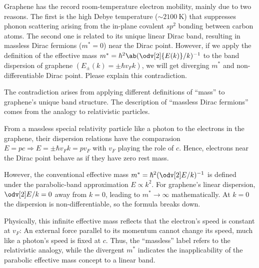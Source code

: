 \begin{problem}
  Graphene has the record room-temperature electron mobility, mainly due to two
  reasons. The first is the high Debye temperature ($\sim\qty{2100}\K$) that
  suppresses phonon scattering arising from the in-plane covalent $sp^2$ bonding
  between carbon atoms. The second one is related to its unique linear Dirac
  band, resulting in massless Dirac fermions ($m^* = 0$) near the Dirac point.
  However, if we apply the definition of the effective
  mass $m^* = \hbar^2\ab(\odv[2]{E(k)}/k)^{-1}$ to the band dispersion of
  graphene $(E_\pm(k) = \pm \hbar v_Fk)$, we will get diverging $m^*$ and
  non-differentiable Dirac point. Please explain this contradiction.
\end{problem}
\begin{solution}
  The contradiction arises from applying different definitions of ``mass'' to
  graphene's unique band structure. The description of ``massless Dirac
  fermions'' comes from the analogy to relativistic particles.

  From a massless special relativity particle like a photon to the electrons in
  the graphene, their dispersion relations have the comparasion
  $E = pc \Longrightarrow E = \pm \hbar v_F k = p v_F$
  with $v_F$ playing the role of $c$. Hence, electrons near the Dirac point
  behave as if they have zero rest mass.

  However, the conventional effective mass $m^* = \hbar^2 (\odv[2]E/k)^{-1}$ is
  defined under the parabolic-band approximation $E \propto k^2$. For graphene's
  linear dispersion, $\odv[2]E/k = 0$ away from $k = 0$, leading
  to $m^* \to \infty$ mathematically. At $k = 0$ the dispersion is
  non-differentiable, so the formula breaks down.

  Physically, this infinite effective mass reflects that the electron's speed is
  constant at $v_F$: An external force parallel to its momentum cannot change
  its speed, much like a photon's speed is fixed at $c$. Thus, the ``massless''
  label refers to the relativistic analogy, while the divergent $m^*$ indicates
  the inapplicability of the parabolic effective mass concept to a linear band.
\end{solution}